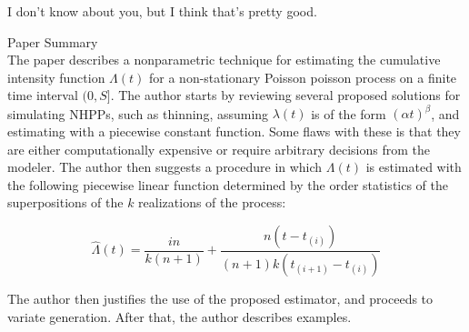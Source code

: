 \documentclass[11pt]{article} %
\begin{document}
\begin{enumerate}
I don't know about you, but I think that's pretty good.


\end{enumerate}

{\large Paper Summary}\\

The paper describes a nonparametric technique for estimating the cumulative intensity function $\Lambda(t)$ for a non-stationary Poisson poisson process on a finite time interval $(0,S]$.  The author starts by reviewing several proposed solutions for simulating NHPPs, such as thinning, assuming $\lambda(t)$ is of the form $(\alpha t)^\beta$, and estimating with a piecewise constant function.  Some flaws with these is that they are either computationally expensive or require arbitrary decisions from the modeler.  The author then suggests a procedure in which $\Lambda(t)$ is estimated with the following piecewise linear function determined by the order statistics of the superpositions of the $k$ realizations of the process:

$$\hat{\Lambda}(t) = \frac{in}{k(n+1)} + \frac{n(t - t_{(i)})}{(n+1)k(t_{(i+1)} - t_{(i)})}$$

The author then justifies the use of the proposed estimator, and proceeds to variate generation.  After that, the author describes examples.
\end{document}
